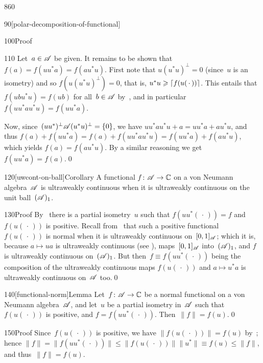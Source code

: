 \begin{parsec}{860}
\begin{point}{90}[polar-decomposition-of-functional]
\begin{point}{100}{Proof}
\begin{point}{110}
Let~$a\in\mathscr{A}$ be given.
It remains to be shown that $f(a)=f(uu^*a)=f(au^*u)$.
First note that  $u(u^*u)^\perp = 0$ (since~$u$ is an isometry)
and so $f(u(u^*u)^\perp)=0$,
that is,  $u^*u\geqslant \left\lceil f(u(\,\cdot\,))\right\rceil$.
This entails that $f(ubu^*u)=f(ub)$ for all~$b\in\mathscr{A}$
by~, and in particular $f(uu^*au^*u)=f(uu^*a)$.

Now, since~$(uu^*)^\perp\mathscr{A}(u^*u)^\perp = \{0\}$,
we have $uu^* a u^*u + a = uu^*a + au^*u$,
and thus $f(a)+f(uu^*a)=f(a)+f(uu^*au^*u)=f(uu^*a)+f(au^*u)$,
which yields $f(a)=f(au^*u)$.
By a similar reasoning we get $f(uu^*a)=f(a)$.\qed
\end{point}
\end{point}
\end{point}
\begin{point}{120}[uwcont-on-ball]{Corollary}%
A functional $f\colon \mathscr{A}\to\mathbb{C}$
on a von Neumann algebra~$\mathscr{A}$
is ultraweakly continuous
when it is ultraweakly continuous
on the unit ball~$(\mathscr{A})_1$.
\begin{point}{130}{Proof}%
By~
there is a partial isometry~$u$
such that $f(uu^*(\,\cdot\,))=f$
and~$f(u(\,\cdot\,))$ is positive.
Recall from~ that such a positive functional~$f(u(\,\cdot\,))$
is normal when it is ultraweakly continuous
on~$[0,1]_{\mathscr{A}}$;
which it is, 
because $a\mapsto ua$ is ultraweakly continuous (see ),
maps~$[0,1]_{\mathscr{A}}$ into~$(\mathscr{A})_1$,
and $f$ is ultraweakly continuous on~$(\mathscr{A})_1$.
But then~$f\equiv f(uu^*(\,\cdot\,))$
being the composition of the ultraweakly continuous maps
$f(u(\,\cdot\,))$ and $a\mapsto u^*a$ 
is ultraweakly continuous on~$\mathscr{A}$ too.\qed
\end{point}
\end{point}
\begin{point}{140}[functional-norm]{Lemma}%
Let~$f\colon \mathscr{A}\to\mathbb{C}$
be a normal functional
on a von Neumann algebra~$\mathscr{A}$,
and let~$u$ be a partial isometry in~$\mathscr{A}$
such that~$f(u(\,\cdot\,))$ is positive,
and $f=f(uu^*(\,\cdot\,))$.
Then~$\|f\|=f(u)$.\qed
\begin{point}{150}{Proof}%
Since~$f(u(\,\cdot\,))$ is positive,
we have $\|f(u(\,\cdot\,))\|=f(u)$
by~;
hence $\|f\|=\|f(uu^*(\,\cdot\,))\|
\leq \|f(u(\,\cdot\,))\|\|u^*\|
\equiv f(u) \leq \|f\|$,
and thus~$\|f\|=f(u)$.


\end{point}
\end{point}
\end{parsec}

